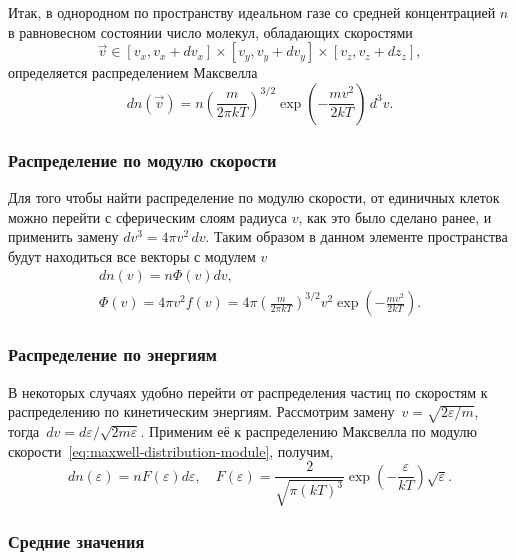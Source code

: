 Итак, в однородном по пространству идеальном газе со средней концентрацией $n$ в равновесном состоянии число молекул, обладающих скоростями
\begin{equation*}
    \vec{v} \in [v_x, v_x + d v_x] \times [v_y, v_y + d v_y] \times [v_z, v_z + d z_z],
\end{equation*}
определяется распределением Максвелла
\begin{equation}
    d n(\vec{v})
        = n \left(\frac{m}{2 \pi k T}\right)^{3 / 2} \exp \left(-\frac{m v^2}{2 k T}\right) \, d^3 v.
    \label{eq:maxwell-distribution}
\end{equation}

\subsubsection{Распределение по модулю скорости}
Для того чтобы найти распределение по модулю скорости, от единичных клеток можно перейти с сферическим слоям радиуса $v$, как это было сделано ранее, и применить замену $dv^3 =  4 \pi v^2 \, dv$. Таким образом в данном элементе пространства будут находиться все векторы с модулем $v$
\begin{gather}
d n(v)=n \Phi(v) d v, \nonumber\\ 
\Phi(v)=4 \pi v^2 f(v)=4 \pi\left(\frac{m}{2 \pi k T}\right)^{3 / 2} v^2 \exp \left(-\frac{m v^2}{2 k T}\right).
\label{eq:maxwell-distribution-module}
\end{gather}

\subsubsection{Распределение по энергиям}
В некоторых случаях удобно перейти от распределения частиц по скоростям к распределению по кинетическим энергиям. Рассмотрим замену~$v = \sqrt{2 \varepsilon / m}$, тогда~$dv = d\varepsilon / \sqrt{2 m \varepsilon}$. Применим её к распределению Максвелла по модулю скорости~\eqref{eq:maxwell-distribution-module}, получим,
\begin{equation}
d n(\varepsilon)=n F(\varepsilon) d \varepsilon, \quad F(\varepsilon)=\frac{2}{\sqrt{\pi(k T)^3}} \exp \left(-\frac{\varepsilon}{k T}\right) \sqrt{\varepsilon}.
\end{equation}

\subsubsection{Средние значения}

